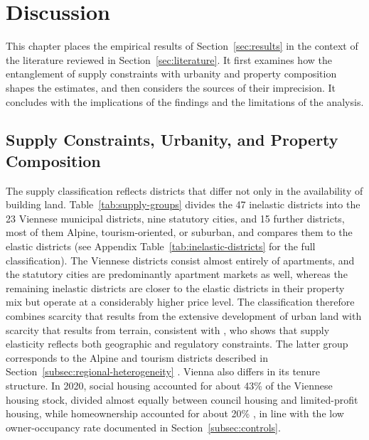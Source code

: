 \documentclass[a4paper,12pt, headsepline]{scrartcl}
\numberwithin{equation}{section}
\begin{document}
\section{Discussion}\label{sec:discussion}

This chapter places the empirical results of Section~\ref{sec:results} in the context of the literature reviewed in Section~\ref{sec:literature}. It first examines how the entanglement of supply constraints with urbanity and property composition shapes the estimates, and then considers the sources of their imprecision. It concludes with the implications of the findings and the limitations of the analysis.

\subsection{Supply Constraints, Urbanity, and Property Composition}\label{subsec:urbanity-composition}

The supply classification reflects districts that differ not only in the availability of building land. Table~\ref{tab:supply-groups} divides the 47 inelastic districts into the 23 Viennese municipal districts, nine statutory cities, and 15 further districts, most of them Alpine, tourism-oriented, or suburban, and compares them to the elastic districts (see Appendix Table~\ref{tab:inelastic-districts} for the full classification). The Viennese districts consist almost entirely of apartments, and the statutory cities are predominantly apartment markets as well, whereas the remaining inelastic districts are closer to the elastic districts in their property mix but operate at a considerably higher price level. The classification therefore combines scarcity that results from the extensive development of urban land with scarcity that results from terrain, consistent with \citet{saiz2010}, who shows that supply elasticity reflects both geographic and regulatory constraints. The latter group corresponds to the Alpine and tourism districts described in Section~\ref{subsec:regional-heterogeneity} \citep{reiner2023, schindelegger2025}. Vienna also differs in its tenure structure. In 2020, social housing accounted for about 43\% of the Viennese housing stock, divided almost equally between council housing and limited-profit housing, while homeownership accounted for about 20\% \citep{kadi2022}, in line with the low owner-occupancy rate documented in Section~\ref{subsec:controls}.
\end{document}
